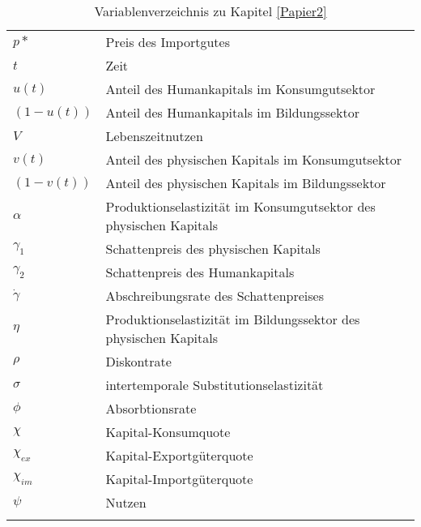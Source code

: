 \begin{longtable}{|l|l|}
		$p*$ & Preis des Importgutes\\%
		$t$ & Zeit\\%
		$u(t)$ & Anteil des Humankapitals im Konsumgutsektor\\%
		$(1-u(t))$ & Anteil des Humankapitals im Bildungssektor\\%
		$V$ & Lebenszeitnutzen\\%
		$v(t)$ & Anteil des physischen Kapitals im Konsumgutsektor\\%
		$(1-v(t))$ & Anteil des physischen Kapitals im Bildungssektor\\%
		$\alpha$ & Produktionselastizität im Konsumgutsektor des physischen Kapitals\\%
		$\gamma_{1}$ & Schattenpreis des physischen Kapitals\\%
		$\gamma_{2}$ & Schattenpreis des Humankapitals\\%
		$\dot{\gamma}$ & Abschreibungsrate des Schattenpreises\\%
		$\eta$ & Produktionselastizität im Bildungssektor des physischen Kapitals\\%
		$\rho$ & Diskontrate\\%
		$\sigma$ & intertemporale Substitutionselastizität\\%
		$\phi$ & Absorbtionsrate\\%
		$\chi$ & Kapital-Konsumquote\\%
		$\chi_{ex}$ & Kapital-Exportgüterquote\\%
		$\chi_{im}$ & Kapital-Importgüterquote\\%
		$\psi$ & Nutzen \\%

\hline
\caption{Variablenverzeichnis zu Kapitel \ref{Papier2}}
\end{longtable}